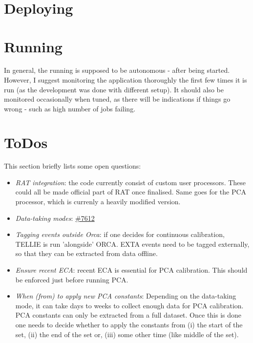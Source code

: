 \documentclass[12pt]{article}
\begin{document}
\clearpage

\section{Deploying} %

\section{Running}\label{sec:run}
\paragraph{}
In general, the running is supposed to be autonomous - after being started. However, I suggest monitoring the application thoroughly the first few times it is run (as the development was done with different setup). It should also be monitored occasionally when tuned, as there will be indications if things go wrong - such as high number of jobs failing. 

\section{ToDos}
\paragraph{}
This section briefly lists some open questions:
\begin{itemize}
	\item \textit{RAT integration}: the code currently consist of custom user processors. These could all be made official part of RAT once finalised. Same goes for the PCA processor, which is currenly a heavily modified version.
	\item \textit{Data-taking modes}: \href{https://www.snolab.ca/snoplus/private/DocDB/cgi/ShowDocument?docid=7612}{\#7612}
	\item \textit{Tagging events outside Orca}: if one decides for continuous calibration, TELLIE is run 'alongside' ORCA. EXTA events need to be tagged externally, so that they can be extracted from data offline.
	\item \textit{Ensure recent ECA}: recent ECA is essential for PCA calibration. This should be enforced just before running PCA.
	\item \textit{When (from) to apply new PCA constants}: Depending on the data-taking mode, it can take days to weeks to collect enough data for PCA calibration. PCA constants can only be extracted from a full dataset. Once this is done one needs to decide whether to apply the constants from (i) the start of the set, (ii) the end of the set or, (iii) some other time (like middle of the set).
\end{itemize}
\end{document}

